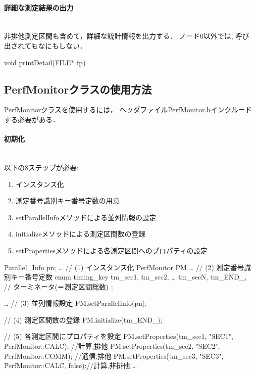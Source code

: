 \paragraph{詳細な測定結果の出力}\mbox{}\\
非排他測定区間も含めて，詳細な統計情報を出力する．
ノード0以外では, 呼び出されてもなにもしない．
{\small
\begin{program}
void printDetail(FILE* fp)
\end{program}
}


\subsection{PerfMonitorクラスの使用方法}
PerfMonitorクラスを使用するには，
ヘッダファイルPerfMonitor.hインクルードする必要がある．

\paragraph{初期化}\mbox{}\\
以下の8ステップが必要:
\begin{enumerate}
\item インスタンス化
\item 測定番号識別キー番号定数の用意
\item setParallelInfoメソッドによる並列情報の設定
\item initializeメソッドによる測定区間数の登録
\item setPropertiesメソッドによる各測定区間へのプロパティの設定
\end{enumerate}

{\small
\begin{program}

  Parallel_Info pn;
  …
  // (1) インスタンス化
  PerfMonitor PM
  …
  // (2) 測定番号識別キー番号定数
  enum timing_key {
    tm_sec1,
    tm_sec2,
    … 
    tm_secN,
    tm_END_,   // ターミネータ(＝測定区間総数)
  };

  …
  // (3) 並列情報設定
  PM.setParallelInfo(pn);

  // (4) 測定区間数の登録
  PM.initialize(tm_END_);

  // (5) 各測定区間にプロパティを設定
  PM.setProperties(tm_sec1, "SEC1", PerfMonitor::CALC);       //計算,排他
  PM.setProperties(tm_sec2, "SEC2", PerfMonitor::COMM);       //通信,排他
  PM.setProperties(tm_sec3, "SEC3", PerfMonitor::CALC, false);//計算,非排他
  …
\end{program}
}

